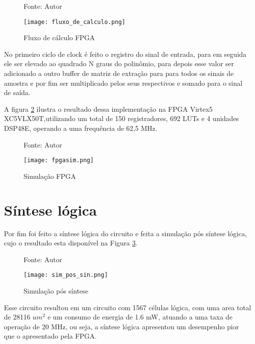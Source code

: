 \begin{figure}[ht!]
	\centering
	\captionsetup{justification=centering}
	\caption*{Fonte: Autor}
	\texttt{[image: fluxo\_de\_calculo.png]}
	\caption{Fluxo de cálculo FPGA}
	\label{fig:fluxocal}
\end{figure}

No primeiro ciclo de clock é feito o registro do sinal de entrada, para em seguida ele ser elevado ao quadrado N graus do polinômio, para depois esse valor ser adicionado a outro buffer de matriz de extração para para todos os sinais de amostra e por fim ser multiplicado pelos seus respectivos e somado para o sinal de saída.

A figura \ref{fig:simfpga} ilustra o resultado dessa implementação na FPGA Virtex5 XC5VLX50T,utilizando um total de 150 registradores, 692 LUTs e 4 unidades DSP48E, operando a uma frequência de 62,5 MHz.
\begin{figure}[ht!]
	\centering
	\captionsetup{justification=centering}
	\caption*{Fonte: Autor}
	\texttt{[image: fpgasim.png]}
	\caption{Simulação FPGA}
	\label{fig:simfpga}
\end{figure}


\section{Síntese lógica}
Por fim foi feito a síntese lógica do circuito e feita a simulação pós síntese lógica, cujo o resultado esta disponível na Figura \ref{fig:simpost}.

\begin{figure}[ht!]
	\centering
	\captionsetup{justification=centering}
	\caption*{Fonte: Autor}
	\texttt{[image: sim\_pos\_sin.png]}
	\caption{Simulação pós síntese}
	\label{fig:simpost}
\end{figure}

Esse circuito resultou em um circuito com 1567 células lógica, com uma area total de 28116 $um^2$ e um consumo de energia de 1.6 mW, atuando a uma taxa de operação de 20 MHz, ou seja, a síntese lógica apresentou um desempenho pior que o apresentado pela FPGA. 
